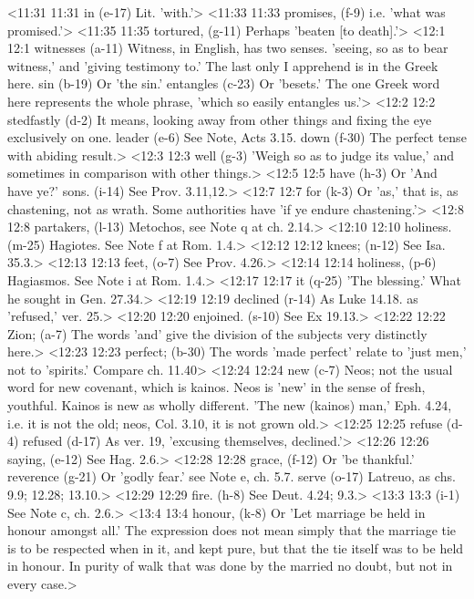 <11:31 11:31  in (e-17)  Lit. 'with.'>
<11:33 11:33  promises, (f-9)  i.e. 'what was promised.'>
<11:35 11:35  tortured, (g-11)  Perhaps 'beaten [to death].'>
<12:1 12:1  witnesses (a-11)  Witness, in English, has two senses. 'seeing, so as to bear  witness,' and 'giving testimony to.' The last only I apprehend  is in the Greek here.
  sin (b-19)  Or 'the sin.'
  entangles (c-23)  Or 'besets.' The one Greek word here represents the whole  phrase, 'which so easily entangles us.'>
<12:2 12:2  stedfastly (d-2)  It means, looking away from other things and fixing the eye  exclusively on one.
  leader (e-6)  See Note, Acts 3.15.
  down (f-30)  The perfect tense with abiding result.>
<12:3 12:3  well (g-3)  'Weigh so as to judge its value,' and sometimes in comparison  with other things.>
<12:5 12:5  have (h-3)  Or 'And have ye?'
  sons. (i-14)  See Prov. 3.11,12.>
<12:7 12:7  for (k-3)  Or 'as,' that is, as chastening, not as wrath. Some  authorities have 'if ye endure chastening.'>
<12:8 12:8  partakers, (l-13)  Metochos, see Note q at ch. 2.14.>
<12:10 12:10  holiness. (m-25)  Hagiotes. See Note f at Rom. 1.4.>
<12:12 12:12  knees; (n-12)  See Isa. 35.3.>
<12:13 12:13  feet, (o-7)  See Prov. 4.26.>
<12:14 12:14  holiness, (p-6)  Hagiasmos. See Note i at Rom. 1.4.>
<12:17 12:17  it (q-25)  'The blessing.' What he sought in Gen. 27.34.>
<12:19 12:19  declined (r-14)  As Luke 14.18. as 'refused,' ver. 25.>
<12:20 12:20  enjoined. (s-10)  See Ex 19.13.>
<12:22 12:22  Zion; (a-7)  The words 'and' give the division of the subjects very  distinctly here.>
<12:23 12:23  perfect; (b-30)  The words 'made perfect' relate to 'just men,' not to  'spirits.' Compare ch. 11.40>
<12:24 12:24  new (c-7)  Neos; not the usual word for new covenant, which is  kainos. Neos is 'new' in the sense of fresh, youthful.  Kainos is new as wholly different. 'The new (kainos) man,'  Eph. 4.24, i.e. it is not the old; neos, Col. 3.10, it is not  grown old.>
<12:25 12:25  refuse (d-4)  refused (d-17)
  As ver. 19, 'excusing themselves, declined.'>
<12:26 12:26  saying, (e-12)  See Hag. 2.6.>
<12:28 12:28  grace, (f-12)  Or 'be thankful.'
  reverence (g-21)  Or 'godly fear.' see Note e, ch. 5.7.
  serve (o-17)  Latreuo, as chs. 9.9; 12.28; 13.10.>
<12:29 12:29  fire. (h-8)  See Deut. 4.24; 9.3.>
<13:3 13:3   (i-1)  See Note c, ch. 2.6.>
<13:4 13:4  honour, (k-8)  Or 'Let marriage be held in honour amongst all.' The  expression does not mean simply that the marriage tie is to be  respected when in it, and kept pure, but that the tie itself  was to be held in honour. In purity of walk that was done by  the married no doubt, but not in every case.>
